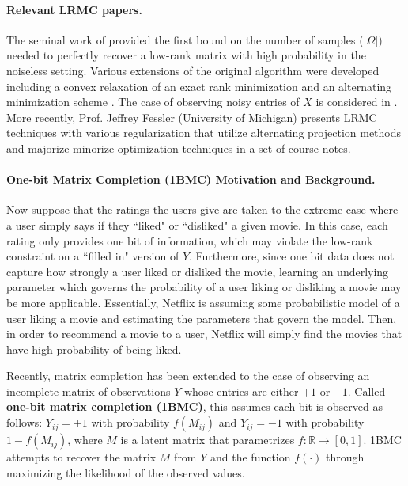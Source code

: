 \paragraph{\textbf{Relevant LRMC papers.}} The seminal work of \cite{candes2009exact} provided the first bound on the number of samples ($|\Omega|$) needed to perfectly recover a low-rank matrix with high probability in the noiseless setting. Various extensions of the original algorithm were developed including a convex relaxation of an exact rank minimization \cite{candes2010power} and an alternating minimization scheme \cite{cai2010singular}. The case of observing noisy entries of $X$ is considered in \cite{candes2010matrix}. More recently, Prof. Jeffrey Fessler (University of Michigan) presents LRMC techniques with various regularization that utilize alternating projection methods and majorize-minorize optimization techniques \cite{fessler_2019} in a set of course notes.

\paragraph{\textbf{One-bit Matrix Completion (1BMC) Motivation and Background.}} Now suppose that the ratings the users give are taken to the extreme case where a user simply says if they ``liked" or ``disliked" a given movie. In this case, each rating only provides one bit of information, which may violate the low-rank constraint on a ``filled in" version of $Y$. Furthermore, since one bit data does not capture how strongly a user liked or disliked the movie, learning an underlying parameter which governs the probability of a user liking or disliking a movie may be more applicable. Essentially, Netflix is assuming some probabilistic model of a user liking a movie and estimating the parameters that govern the model. Then, in order to recommend a movie to a user, Netflix will simply find the movies that have high probability of being liked.

 Recently, matrix completion has been extended to the case of observing an incomplete matrix of observations $Y$ whose entries are either $+1$ or $-1$. Called \textbf{one-bit matrix completion (1BMC)}, this assumes each bit is observed as follows: $Y_{ij} = +1$ with probability $f(M_{ij})$ and $Y_{ij} = -1$ with probability $1 - f(M_{ij})$, where $M$ is a latent matrix that parametrizes $f:\mathbb{R} \rightarrow [0,1]$. 1BMC attempts to recover the matrix $M$ from $Y$ and the function $f(\cdot)$ through maximizing the likelihood of the observed values. 

